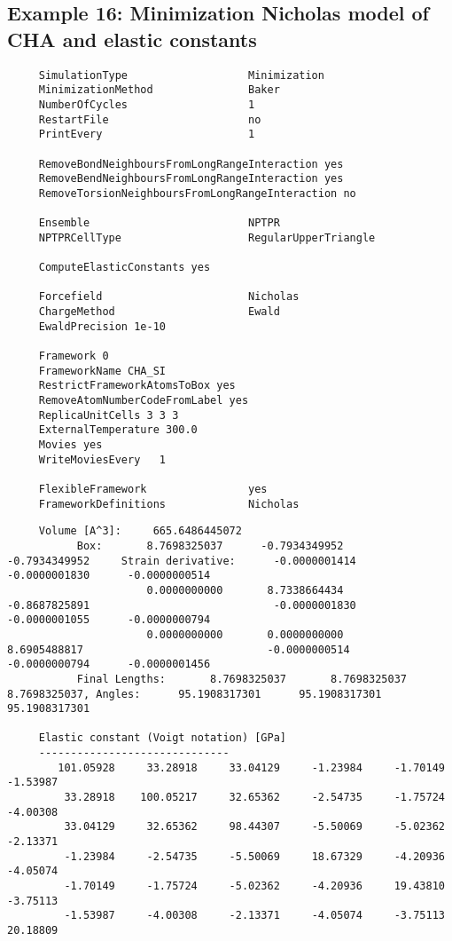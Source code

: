 \subsection*{Example 16: Minimization Nicholas model of CHA and elastic constants}
\begin{tiny}
\begin{verbatim}
     SimulationType                   Minimization
     MinimizationMethod               Baker
     NumberOfCycles                   1
     RestartFile                      no
     PrintEvery                       1

     RemoveBondNeighboursFromLongRangeInteraction yes
     RemoveBendNeighboursFromLongRangeInteraction yes
     RemoveTorsionNeighboursFromLongRangeInteraction no

     Ensemble                         NPTPR
     NPTPRCellType                    RegularUpperTriangle

     ComputeElasticConstants yes

     Forcefield                       Nicholas
     ChargeMethod                     Ewald
     EwaldPrecision 1e-10

     Framework 0
     FrameworkName CHA_SI
     RestrictFrameworkAtomsToBox yes
     RemoveAtomNumberCodeFromLabel yes
     ReplicaUnitCells 3 3 3
     ExternalTemperature 300.0
     Movies yes
     WriteMoviesEvery   1

     FlexibleFramework                yes
     FrameworkDefinitions             Nicholas
\end{verbatim}
\end{tiny}

\begin{tiny}
\begin{verbatim}
     Volume [A^3]:     665.6486445072
           Box:       8.7698325037      -0.7934349952      -0.7934349952     Strain derivative:      -0.0000001414      -0.0000001830      -0.0000000514
                      0.0000000000       8.7338664434      -0.8687825891                             -0.0000001830      -0.0000001055      -0.0000000794
                      0.0000000000       0.0000000000       8.6905488817                             -0.0000000514      -0.0000000794      -0.0000001456
           Final Lengths:       8.7698325037       8.7698325037       8.7698325037, Angles:      95.1908317301      95.1908317301      95.1908317301

     Elastic constant (Voigt notation) [GPa]
     ------------------------------
        101.05928     33.28918     33.04129     -1.23984     -1.70149     -1.53987
         33.28918    100.05217     32.65362     -2.54735     -1.75724     -4.00308
         33.04129     32.65362     98.44307     -5.50069     -5.02362     -2.13371
         -1.23984     -2.54735     -5.50069     18.67329     -4.20936     -4.05074
         -1.70149     -1.75724     -5.02362     -4.20936     19.43810     -3.75113
         -1.53987     -4.00308     -2.13371     -4.05074     -3.75113     20.18809
\end{verbatim}
\end{tiny}

